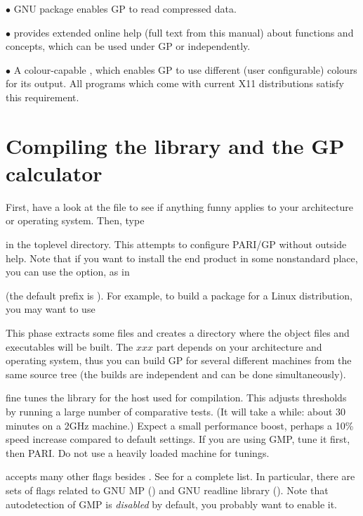   $\bullet$ GNU  package enables GP to read compressed
data.

  $\bullet$  provides extended online help (full text from this
manual) about functions and concepts, which can be used under GP or
independently.

  $\bullet$ A colour-capable , which enables GP to use different
(user configurable) colours for its output. All  programs which
come with current X11 distributions satisfy this requirement.
\section{Compiling the library and the GP calculator}

 First, have a look at the  file
to see if anything funny applies to your architecture or operating system.
Then, type 


\noindent in the toplevel directory. This attempts to configure PARI/GP
without outside help. Note that if you want to install the end product in
some nonstandard place, you can use the  option, as in


\noindent (the default prefix is ). For example, to build a
package for a Linux distribution, you may want to use


This phase extracts some files and creates a directory  where the
object files and executables will be built. The $xxx$ part depends on your
architecture and operating system, thus you can build GP for several
different machines from the same source tree (the builds are
independent and can be done simultaneously).


\noindent fine tunes the library for the host used for compilation. This
adjusts thresholds by running a large number of comparative tests. (It will
take a while: about 30 minutes on a 2GHz machine.) Expect a small performance
boost, perhaps a 10\%
speed increase compared to default settings. If you are using GMP, tune it
first, then PARI. Do not use a heavily loaded machine for tunings.

  accepts many other flags
besides . See  for a complete list. In
particular, there are sets of flags related to GNU MP () and
GNU readline library (). Note that autodetection of GMP
is \emph{disabled} by default, you probably want to enable it.


